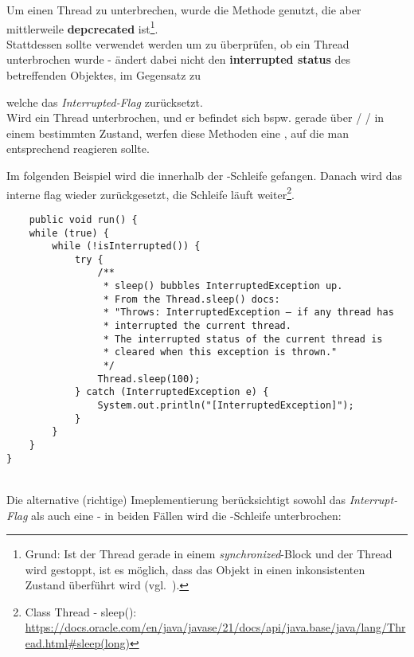 Um einen Thread zu unterbrechen, wurde die Methode  genutzt, die aber mittlerweile \textbf{depcrecated} ist\footnote{
Grund: Ist der Thread gerade in einem \textit{synchronized}-Block und der Thread wird gestoppt, ist es möglich, dass das Objekt in einen inkonsistenten Zustand überführt wird (vgl.~\cite[40]{Oec22}).
}.\\
Stattdessen sollte  verwendet werden um zu überprüfen, ob ein Thread unterbrochen wurde -  ändert dabei nicht den \textbf{interrupted status} des betreffenden Objektes, im Gegensatz zu
\begin{center}
\end{center}
welche das \textit{Interrupted-Flag} zurücksetzt.\\

Wird ein Thread unterbrochen, und er befindet sich bspw. gerade über  /  /  in einem bestimmten Zustand, werfen diese Methoden eine , auf die man entsprechend reagieren sollte.

\newpage

Im folgenden Beispiel wird die  innerhalb der -Schleife gefangen. Danach wird
das interne flag wieder zurückgesetzt, die Schleife läuft weiter\footnote{
    Class Thread - sleep(): \url{https://docs.oracle.com/en/java/javase/21/docs/api/java.base/java/lang/Thread.html#sleep(long)}
}.
\begin{verbatim}
    public void run() {
    while (true) {
        while (!isInterrupted()) {
            try {
                /**
                 * sleep() bubbles InterruptedException up.
                 * From the Thread.sleep() docs:
                 * "Throws: InterruptedException – if any thread has
                 * interrupted the current thread.
                 * The interrupted status of the current thread is
                 * cleared when this exception is thrown."
                 */
                Thread.sleep(100);
            } catch (InterruptedException e) {
                System.out.println("[InterruptedException]");
            }
        }
    }
}
\end{verbatim}\\

Die alternative (richtige) Imeplementierung berücksichtigt sowohl das \textit{Interrupt-Flag} als auch eine  - in beiden Fällen wird die -Schleife unterbrochen:

